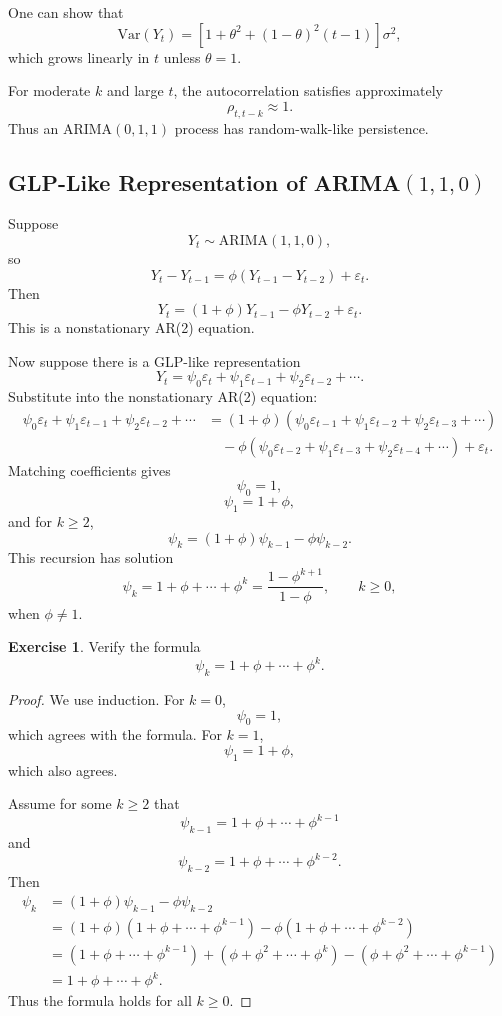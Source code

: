 \documentclass[12pt,oneside]{book}
\numberwithin{equation}{section}
\theoremstyle{definition}
\newtheorem{exercise}{Exercise}[section]
\theoremstyle{plain}
\theoremstyle{remark}
\newcommand{\Var}{\mathrm{Var}}
\begin{document}
One can show that
\[
\Var(Y_t)
=
\left[
1+\theta^2+(1-\theta)^2(t-1)
\right]\sigma^2,
\]
which grows linearly in $t$ unless $\theta=1$.

For moderate $k$ and large $t$, the autocorrelation satisfies approximately
\[
\rho_{t,t-k}
\approx 1.
\]
Thus an ARIMA$(0,1,1)$ process has random-walk-like persistence.

\subsection*{GLP-Like Representation of ARIMA$(1,1,0)$}

Suppose
\[
Y_t\sim \mathrm{ARIMA}(1,1,0),
\]
so
\[
Y_t-Y_{t-1}
=
\phi(Y_{t-1}-Y_{t-2})+\varepsilon_t.
\]
Then
\[
Y_t
=
(1+\phi)Y_{t-1}
-
\phi Y_{t-2}
+
\varepsilon_t.
\]
This is a nonstationary AR(2) equation.

Now suppose there is a GLP-like representation
\[
Y_t
=
\psi_0\varepsilon_t+\psi_1\varepsilon_{t-1}+\psi_2\varepsilon_{t-2}+\cdots.
\]
Substitute into the nonstationary AR(2) equation:
\begin{align*}
\psi_0\varepsilon_t+\psi_1\varepsilon_{t-1}+\psi_2\varepsilon_{t-2}+\cdots
&=
(1+\phi)
(\psi_0\varepsilon_{t-1}+\psi_1\varepsilon_{t-2}+\psi_2\varepsilon_{t-3}+\cdots) \\
&\quad
-\phi
(\psi_0\varepsilon_{t-2}+\psi_1\varepsilon_{t-3}+\psi_2\varepsilon_{t-4}+\cdots)
+\varepsilon_t.
\end{align*}
Matching coefficients gives
\[
\psi_0=1,
\]
\[
\psi_1=1+\phi,
\]
and for $k\geq 2$,
\[
\psi_k=(1+\phi)\psi_{k-1}-\phi\psi_{k-2}.
\]
This recursion has solution
\[
\psi_k
=
1+\phi+\cdots+\phi^k
=
\frac{1-\phi^{k+1}}{1-\phi},
\qquad k\geq 0,
\]
when $\phi\neq 1$.

\begin{exercise}
Verify the formula
\[
\psi_k
=
1+\phi+\cdots+\phi^k.
\]
\end{exercise}

\begin{proof}
We use induction. For $k=0$,
\[
\psi_0=1,
\]
which agrees with the formula. For $k=1$,
\[
\psi_1=1+\phi,
\]
which also agrees.

Assume for some $k\geq 2$ that
\[
\psi_{k-1}=1+\phi+\cdots+\phi^{k-1}
\]
and
\[
\psi_{k-2}=1+\phi+\cdots+\phi^{k-2}.
\]
Then
\begin{align*}
\psi_k
&=
(1+\phi)\psi_{k-1}-\phi\psi_{k-2} \\
&=
(1+\phi)(1+\phi+\cdots+\phi^{k-1})
-
\phi(1+\phi+\cdots+\phi^{k-2}) \\
&=
(1+\phi+\cdots+\phi^{k-1})
+
(\phi+\phi^2+\cdots+\phi^k)
-
(\phi+\phi^2+\cdots+\phi^{k-1}) \\
&=
1+\phi+\cdots+\phi^k.
\end{align*}
Thus the formula holds for all $k\geq 0$.
\end{proof}
\end{document}
